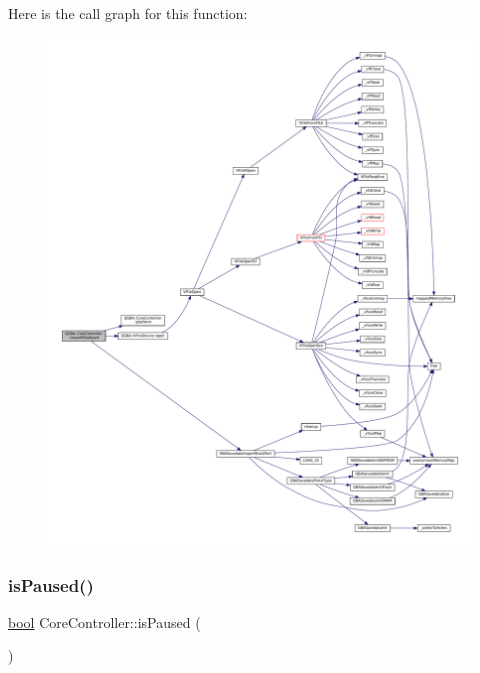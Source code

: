 Here is the call graph for this function\+:
\nopagebreak
\begin{figure}[H]
\begin{center}
\leavevmode
\includegraphics[width=350pt]{class_q_g_b_a_1_1_core_controller_a9593c570b5f23530f1dedfc9e9a670d6_cgraph}
\end{center}
\end{figure}
\mbox{\label{class_q_g_b_a_1_1_core_controller_a4b93ae5c212269bbda95efdb07d849e5}} 
\subsubsection{\texorpdfstring{is\+Paused()}{isPaused()}}
{\footnotesize\ttfamily \mbox{\hyperlink{libretro_8h_a4a26dcae73fb7e1528214a068aca317e}{bool}} Core\+Controller\+::is\+Paused (\begin{DoxyParamCaption}{ }\end{DoxyParamCaption})}

